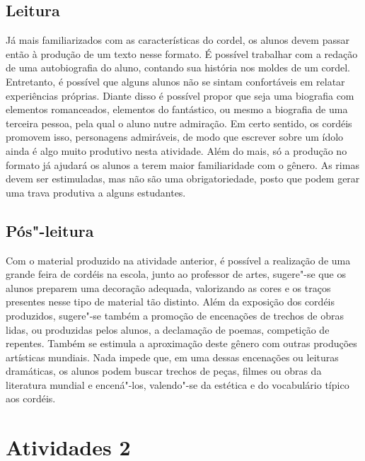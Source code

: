 \documentclass[12pt]{extarticle}
\begin{document}
\subsection{Leitura}


Já mais
familiarizados com as características do cordel, os alunos devem passar
então à produção de um texto nesse formato. É possível trabalhar com a
redação de uma autobiografia do aluno, contando sua história nos moldes
de um cordel. Entretanto, é possível que alguns alunos não se sintam
confortáveis em relatar experiências próprias. Diante disso é possível
propor que seja uma biografia com elementos romanceados, elementos do
fantástico, ou mesmo a biografia de uma terceira pessoa, pela qual o
aluno nutre admiração. Em certo sentido, os cordéis promovem isso,
personagens admiráveis, de modo que escrever sobre um ídolo ainda é algo
muito produtivo nesta atividade. Além do mais, só a produção no formato
já ajudará os alunos a terem maior familiaridade com o gênero. As rimas
devem ser estimuladas, mas não são uma obrigatoriedade, posto que podem
gerar uma trava produtiva a alguns estudantes.

\subsection{Pós"-leitura}


Com o material
produzido na atividade anterior, é possível a realização de uma grande
feira de cordéis na escola, junto ao professor de artes, sugere"-se que
os alunos preparem uma decoração adequada, valorizando as cores e os
traços presentes nesse tipo de material tão distinto. Além da exposição
dos cordéis produzidos, sugere"-se também a promoção de encenações de
trechos de obras lidas, ou produzidas pelos alunos, a declamação de
poemas, competição de repentes. Também se estimula a aproximação deste
gênero com outras produções artísticas mundiais. Nada impede que, em uma
dessas encenações ou leituras dramáticas, os alunos podem buscar trechos
de peças, filmes ou obras da literatura mundial e encená"-los, valendo"-se
da estética e do vocabulário típico aos cordéis.


\section{Atividades 2}
\end{document}
